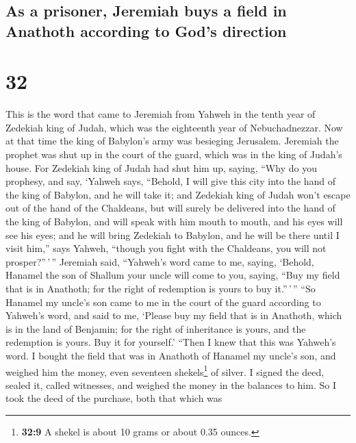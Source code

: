 \hypertarget{as-a-prisoner-jeremiah-buys-a-field-in-anathoth-according-to-gods-direction}{%
\subsection{As a prisoner, Jeremiah buys a field in Anathoth according
to God's
direction}\label{as-a-prisoner-jeremiah-buys-a-field-in-anathoth-according-to-gods-direction}}

\hypertarget{section-31}{%
\section{32}\label{section-31}}

 This is the word that came to Jeremiah from Yahweh in the
tenth year of Zedekiah king of Judah, which was the eighteenth year of
Nebuchadnezzar.  Now at that time the king of Babylon's
army was besieging Jerusalem. Jeremiah the prophet was shut up in the
court of the guard, which was in the king of Judah's house.
 For Zedekiah king of Judah had shut him up, saying, ``Why
do you prophesy, and say, `Yahweh says, ``Behold, I will give this city
into the hand of the king of Babylon, and he will take it;
 and Zedekiah king of Judah won't escape out of the hand
of the Chaldeans, but will surely be delivered into the hand of the king
of Babylon, and will speak with him mouth to mouth, and his eyes will
see his eyes;  and he will bring Zedekiah to Babylon, and
he will be there until I visit him,'' says Yahweh, ``though you fight
with the Chaldeans, you will not prosper?''\,'\,'' 
Jeremiah said, ``Yahweh's word came to me, saying, 
`Behold, Hanamel the son of Shallum your uncle will come to you, saying,
``Buy my field that is in Anathoth; for the right of redemption is yours
to buy it.''\,'\,''  ``So Hanamel my uncle's son came to
me in the court of the guard according to Yahweh's word, and said to me,
`Please buy my field that is in Anathoth, which is in the land of
Benjamin; for the right of inheritance is yours, and the redemption is
yours. Buy it for yourself.' ``Then I knew that this was Yahweh's word.
 I bought the field that was in Anathoth of Hanamel my
uncle's son, and weighed him the money, even seventeen
shekels\footnote{\textbf{32:9} A shekel is about 10 grams or about 0.35
  ounces.} of silver.  I signed the deed, sealed it,
called witnesses, and weighed the money in the balances to him.
 So I took the deed of the purchase, both that which was
